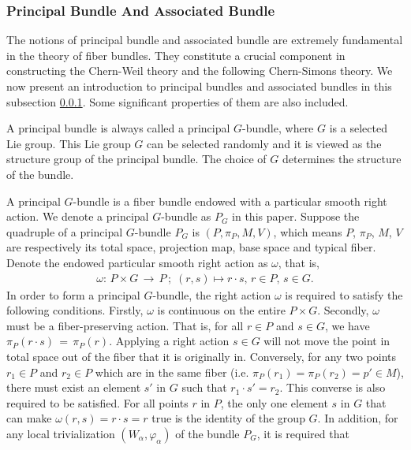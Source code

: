 \subsubsection{Principal Bundle And Associated Bundle}\label{subsubsec: Principal Bundle And Associated Bundle}
\par The notions of principal bundle and associated bundle are extremely fundamental in the theory of fiber bundles. They constitute a crucial component in constructing the Chern-Weil theory and the following Chern-Simons theory. We now present an introduction to principal bundles and associated bundles in this subsection \ref{subsubsec: Principal Bundle And Associated Bundle}. Some significant properties of them are also included. 
\par A principal bundle is always called a principal $G$-bundle, where $G$ is a selected Lie group. This Lie group $G$ can be selected randomly and it is viewed as the structure group of the principal bundle. The choice of $G$ determines the structure of the bundle. 
\par A principal $G$-bundle is a fiber bundle endowed with a particular smooth right action. We denote a principal $G$-bundle as $P_{G}$ in this paper. Suppose the quadruple of a principal $G$-bundle $P_{G}$ is $\left(P,\pi_{P},M,V\right)$, which means $P$, $\pi_{P}$, $M$, $V$ are respectively its total space, projection map, base space and typical fiber. Denote the endowed particular smooth right action as $\omega$, that is, 
\begin{equation}\label{right action of a principal bundle}
    \begin{split}
        \omega:\,P\times G\,\rightarrow\,P\,;\;\left(r,s\right)\mapsto r\cdot s,\,r\in P,\,s\in G. 
    \end{split}
\end{equation}
In order to form a principal $G$-bundle, the right action $\omega$ is required to satisfy the following conditions. Firstly, $\omega$ is continuous on the entire $P\times G$. Secondly, $\omega$ must be a fiber-preserving action. That is, for all $r\in P$ and $s\in G$, we have $\pi_{P}\left(r\cdot s\right)\,=\,\pi_{P}\left(r\right)$. Applying a right action $s\in G$ will not move the point in total space out of the fiber that it is originally in. Conversely, for any two points $r_{1}\in P$ and $r_{2}\in P$ which are in the same fiber (i.e. $\pi_{P}\left(r_{1}\right)=\pi_{P}\left(r_{2}\right)=p'\in M$), there must exist an element $s'$ in $G$ such that $r_{1}\cdot s'=r_{2}$. This converse is also required to be satisfied. For all points $r$ in $P$, the only one element $s$ in $G$ that can make $\omega\left(r,s\right)=r\cdot s=r$ true is the identity of the group $G$. In addition, for any local trivialization $\left(W_{\alpha},\varphi_{\alpha}\right)$ of the bundle $P_{G}$, it is required that 
